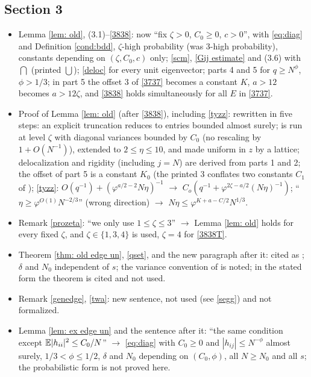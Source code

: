 \subsection*{Section 3}
\begin{itemize}
\item Lemma \ref{lem: old}, (3.1)--\eqref{3838}: now ``fix $\zeta>0$, $C_0\ge0$, $c>0$'', with \eqref{eq:diag} and Definition \ref{cond:bdd}, $\zeta$-high probability (was $3$-high probability), constants depending on $(\zeta,C_0,c)$ only; \eqref{scm}, \eqref{Gij estimate} and (3.6) with $\bigcap$ (printed $\bigcup$); \eqref{deloc} for every unit eigenvector; parts 4 and 5 for $q\ge N^\phi$, $\phi>1/3$; in part 5 the offset $3$ of \eqref{3737} becomes a constant $K$, $a>12$ becomes $a>12\zeta$, and \eqref{3838} holds simultaneously for all $E$ in \eqref{3737}.
\item Proof of Lemma \ref{lem: old} (after \eqref{3838}), including \eqref{tyzz}: rewritten in five steps: an explicit truncation reduces to entries bounded almost surely; \cite{EKYY1} is run at level $\zeta$ with diagonal variances bounded by $C_0$ (no rescaling by $1+O(N^{-1})$), extended to $2\le\eta\le10$, and made uniform in $z$ by a lattice; delocalization and rigidity (including $j=N$) are derived from parts 1 and 2; the offset of part 5 is a constant $K_0$ (the printed $3$ conflates two constants $C_1$ of \cite{EKYY1}); \eqref{tyzz}: $O(q^{-1})+(\varphi^{a/2-2}N\eta)^{-1}$ $\to$ $C_o(q^{-1}+\varphi^{2\zeta-a/2}(N\eta)^{-1})$; ``$\eta\ge\varphi^{O(1)}N^{-2/3}$'' (wrong direction) $\to$ $N\eta\le\varphi^{K+a-C/2}N^{1/3}$.
\item Remark \ref{prozeta}: ``we only use $1\le\zeta\le3$'' $\to$ Lemma \ref{lem: old} holds for every fixed $\zeta$, and $\zeta\in\{1,3,4\}$ is used, $\zeta=4$ for \eqref{3838T}.
\item Theorem \ref{thm: old edge un}, \eqref{qset}, and the new paragraph after it: cited as \cite[Theorem 2.7 and Proposition 6.4, (6.15) at $f=0$]{EKYY2}; $\delta$ and $N_0$ independent of $s$; the variance convention of \cite{EKYY2} is noted; in the stated form the theorem is cited and not used.
\item Remark \ref{genedge}, \eqref{twa}: new sentence, not used (see \eqref{segg}) and not formalized.
\item Lemma \ref{lem: ex edge un} and the sentence after it: ``the same condition except $\mathbb{E}|h_{ii}|^2\le C_0/N$'' $\to$ \eqref{eq:diag} with $C_0\ge0$ and $|h_{ij}|\le N^{-\phi}$ almost surely, $1/3<\phi\le1/2$, $\delta$ and $N_0$ depending on $(C_0,\phi)$, all $N\ge N_0$ and all $s$; the probabilistic form is not proved here.

\end{itemize}
